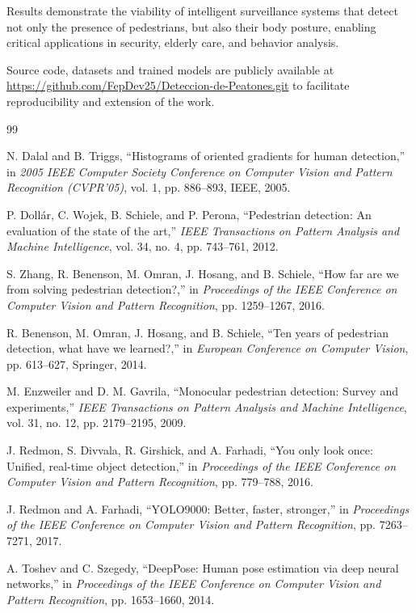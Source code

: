 \documentclass[conference]{IEEEtran}
\begin{document}
Results demonstrate the viability of intelligent surveillance systems that detect not only the presence of pedestrians, but also their body posture, enabling critical applications in security, elderly care, and behavior analysis.

Source code, datasets and trained models are publicly available at \url{https://github.com/FepDev25/Deteccion-de-Peatones.git} to facilitate reproducibility and extension of the work.

\begin{thebibliography}{99}

N. Dalal and B. Triggs, ``Histograms of oriented gradients for human detection,'' in \textit{2005 IEEE Computer Society Conference on Computer Vision and Pattern Recognition (CVPR'05)}, vol. 1, pp. 886--893, IEEE, 2005.

P. Doll\'ar, C. Wojek, B. Schiele, and P. Perona, ``Pedestrian detection: An evaluation of the state of the art,'' \textit{IEEE Transactions on Pattern Analysis and Machine Intelligence}, vol. 34, no. 4, pp. 743--761, 2012.

S. Zhang, R. Benenson, M. Omran, J. Hosang, and B. Schiele, ``How far are we from solving pedestrian detection?,'' in \textit{Proceedings of the IEEE Conference on Computer Vision and Pattern Recognition}, pp. 1259--1267, 2016.

R. Benenson, M. Omran, J. Hosang, and B. Schiele, ``Ten years of pedestrian detection, what have we learned?,'' in \textit{European Conference on Computer Vision}, pp. 613--627, Springer, 2014.

M. Enzweiler and D. M. Gavrila, ``Monocular pedestrian detection: Survey and experiments,'' \textit{IEEE Transactions on Pattern Analysis and Machine Intelligence}, vol. 31, no. 12, pp. 2179--2195, 2009.

J. Redmon, S. Divvala, R. Girshick, and A. Farhadi, ``You only look once: Unified, real-time object detection,'' in \textit{Proceedings of the IEEE Conference on Computer Vision and Pattern Recognition}, pp. 779--788, 2016.

J. Redmon and A. Farhadi, ``YOLO9000: Better, faster, stronger,'' in \textit{Proceedings of the IEEE Conference on Computer Vision and Pattern Recognition}, pp. 7263--7271, 2017.

A. Toshev and C. Szegedy, ``DeepPose: Human pose estimation via deep neural networks,'' in \textit{Proceedings of the IEEE Conference on Computer Vision and Pattern Recognition}, pp. 1653--1660, 2014.


\end{thebibliography}
\end{document}
